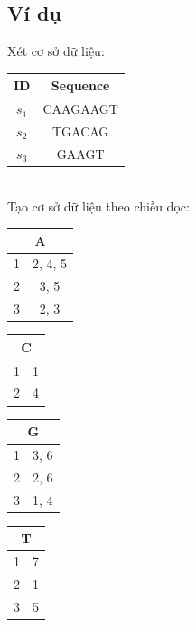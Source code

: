 \documentclass[a4paper 14pt]{article}
\begin{document}
		\subsection{Ví dụ}
			Xét cơ sở dữ liệu:\\
			\begin{tabular}{|c | c |}
				\hline
				ID & Sequence\\ \hline
				$s_1$ & CAAGAAGT\\ \hline
				$s_2$ & TGACAG\\ \hline
				$s_3$ & GAAGT\\ \hline
			\end{tabular}\\
			Tạo cơ sở dữ liệu theo chiều dọc:
			\begin{table}[H]
				\begin{minipage}[t]{0.2\linewidth}
					\begin{tabular}{|c|c|}
						\hline
						\multicolumn{2}{|c|}{A} \\ \hline
						1 & 2, 4, 5\\ \hline
						2 & 3, 5\\ \hline
						3 & 2, 3\\ \hline
					\end{tabular}
				\end{minipage}%
				\begin{minipage}[t]{0.2\linewidth}
					\begin{tabular}{|c|c|}
						\hline
						\multicolumn{2}{|c|}{C} \\ \hline
						1 & 1\\ \hline
						2 & 4\\ \hline
					\end{tabular}
				\end{minipage}%
				\begin{minipage}[t]{0.2\linewidth}
					\begin{tabular}{|c|c|}
						\hline
						\multicolumn{2}{|c|}{G} \\ \hline
						1 & 3, 6\\ \hline
						2 & 2, 6\\ \hline
						3 & 1, 4\\ \hline
					\end{tabular}
				\end{minipage}%
				\begin{minipage}[t]{0.2\linewidth}
					\begin{tabular}{|c|c|}
						\hline
						\multicolumn{2}{|c|}{T} \\ \hline
						1 & 7\\ \hline
						2 & 1\\ \hline
						3 & 5\\ \hline
					\end{tabular}
				\end{minipage}%
			\end{table}
\end{document}
